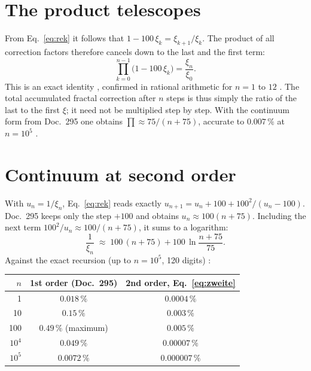 \section{The product telescopes}

From Eq.~\eqref{eq:rek} it follows that $1-100\,\xi_k=\xi_{k+1}/\xi_k$. The product
of all correction factors therefore cancels down to the last and the first term:
\begin{equation}
  \prod_{k=0}^{n-1}\bigl(1-100\,\xi_k\bigr)=\frac{\xi_n}{\xi_0}. \label{eq:tele}
\end{equation}
This is an exact identity \BM, confirmed in rational arithmetic for $n=1$ to $12$
\KM. The total accumulated fractal correction after $n$ steps is thus simply the
ratio of the last to the first $\xi$; it need not be multiplied step by step. With
the continuum form from Doc.~295 one obtains $\prod\approx75/(n+75)$, accurate to
$0.007\,\%$ at $n=10^5$ \KM.

\section{Continuum at second order}

With $u_n=1/\xi_n$, Eq.~\eqref{eq:rek} reads exactly
$u_{n+1}=u_n+100+100^2/(u_n-100)$. Doc.~295 keeps only the step $+100$ and obtains
$u_n\approx100(n+75)$. Including the next term $100^2/u_n\approx100/(n+75)$, it sums
to a logarithm:
\begin{equation}
  \frac{1}{\xi_n}\;\approx\;100\,(n+75)+100\,\ln\frac{n+75}{75}. \label{eq:zweite}
\end{equation}
Against the exact recursion (up to $n=10^5$, 120 digits) \KM:

\begin{center}
\begin{tabular}{rcc}
\toprule
$n$ & 1st order (Doc.~295) & 2nd order, Eq.~\eqref{eq:zweite} \\
\midrule
1 & $0.018\,\%$ & $0.0004\,\%$ \\
10 & $0.15\,\%$ & $0.003\,\%$ \\
100 & $0.49\,\%$ (maximum) & $0.005\,\%$ \\
$10^4$ & $0.049\,\%$ & $0.00007\,\%$ \\
$10^5$ & $0.0072\,\%$ & $0.000007\,\%$ \\
\bottomrule
\end{tabular}
\end{center}


